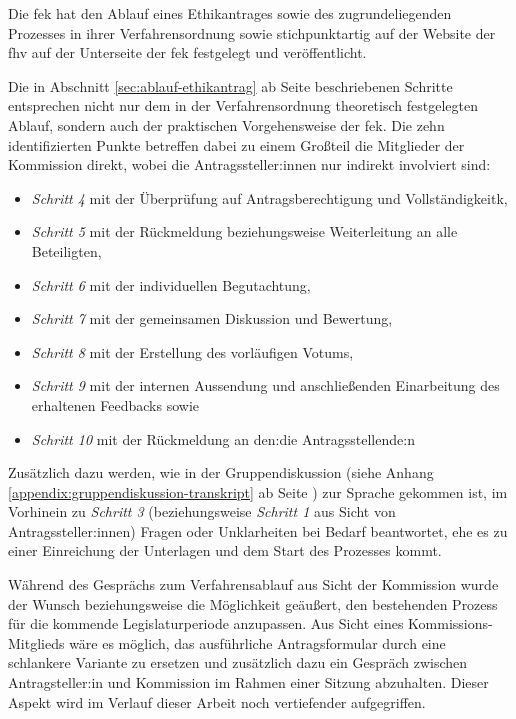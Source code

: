 \documentclass[a4paper,12pt,twoside]{scrreprt}
\begin{document}
Die \acl{fek} hat den Ablauf eines Ethikantrages sowie des zugrundeliegenden Prozesses in ihrer Verfahrensordnung \cite{forschungsethik-kommission_der_fachhochschule_vorarlberg_verfahrensordnung_2020} sowie stichpunktartig auf der Website der \ac{fhv} auf der Unterseite der \ac{fek} \cite{fachhochschule_vorarlberg_gmbh_forschungsethik-kommission_2021} festgelegt und veröffentlicht.

Die in Abschnitt \ref{sec:ablauf-ethikantrag} ab Seite \pageref{sec:ablauf-ethikantrag} beschriebenen Schritte entsprechen nicht nur dem in der Verfahrensordnung theoretisch festgelegten Ablauf, sondern auch der praktischen Vorgehensweise der \ac{fek}. Die zehn identifizierten Punkte betreffen dabei zu einem Großteil die Mitglieder der Kommission direkt, wobei die Antragssteller:innen nur indirekt involviert sind:
\begin{itemize}
    \item \textit{Schritt 4} mit der Überprüfung auf Antragsberechtigung und Vollständigkeitk,
    \item \textit{Schritt 5} mit der Rückmeldung beziehungsweise Weiterleitung an alle Beteiligten,
    \item \textit{Schritt 6} mit der individuellen Begutachtung,
    \item \textit{Schritt 7} mit der gemeinsamen Diskussion und Bewertung,
    \item \textit{Schritt 8} mit der Erstellung des vorläufigen Votums,
    \item \textit{Schritt 9} mit der internen Aussendung und anschließenden Einarbeitung des erhaltenen Feedbacks sowie
    \item \textit{Schritt 10} mit der Rückmeldung an den:die Antragsstellende:n
\end{itemize}

\noindent Zusätzlich dazu werden, wie in der Gruppendiskussion (siehe Anhang \ref{appendix:gruppendiskussion-transkript} ab Seite \pageref{appendix:gruppendiskussion-transkript}) zur Sprache gekommen ist, im Vorhinein zu \textit{Schritt 3} (beziehungsweise \textit{Schritt 1} aus Sicht von Antragssteller:innen) Fragen oder Unklarheiten bei Bedarf beantwortet, ehe es zu einer Einreichung der Unterlagen und dem Start des Prozesses kommt.

\medskip

Während des Gesprächs zum Verfahrensablauf aus Sicht der Kommission wurde der Wunsch beziehungsweise die Möglichkeit geäußert, den bestehenden Prozess für die kommende Legislaturperiode anzupassen. Aus Sicht eines Kommissions-Mitglieds wäre es möglich, das ausführliche Antragsformular durch eine schlankere Variante zu ersetzen und zusätzlich dazu ein Gespräch zwischen Antragsteller:in und Kommission im Rahmen einer Sitzung abzuhalten. Dieser Aspekt wird im Verlauf dieser Arbeit noch vertiefender aufgegriffen.
\end{document}
